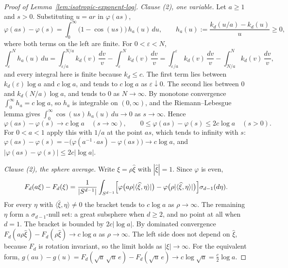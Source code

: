 \begin{proof}[Proof of Lemma~\ref{lem:isotropic-exponent-log}]
\emph{Clause (2), one variable.} Let $a \ge 1$ and $s > 0$. Substituting $u = ar$ in
$\varphi(as)$,
\[
  \varphi(as) - \varphi(s) = \int_0^\infty \bigl(1 - \cos(us)\bigr)\,h_a(u)\,du ,
  \qquad h_a(u) := \frac{k_d(u/a) - k_d(u)}{u} \ge 0 ,
\]
where both terms on the left are finite. For $0 < \varepsilon < N$,
\[
  \int_\varepsilon^N h_a(u)\,du = \int_{\varepsilon/a}^{N/a}k_d(v)\,\frac{dv}{v}
     - \int_\varepsilon^N k_d(v)\,\frac{dv}{v}
   = \int_{\varepsilon/a}^{\varepsilon}k_d(v)\,\frac{dv}{v} - \int_{N/a}^{N}k_d(v)\,\frac{dv}{v} ,
\]
and every integral here is finite because $k_d \le c$. The first term lies between
$k_d(\varepsilon)\log a$ and $c\log a$, and tends to $c\log a$ as $\varepsilon \downarrow 0$. The
second lies between $0$ and $k_d(N/a)\log a$, and tends to $0$ as $N \to \infty$. By monotone
convergence $\int_0^\infty h_a = c\log a$, so $h_a$ is integrable on $(0,\infty)$, and the
Riemann--Lebesgue lemma gives $\int_0^\infty\cos(us)\,h_a(u)\,du \to 0$ as $s \to \infty$. Hence
\[
  \varphi(as) - \varphi(s) \to c\log a \quad (s \to \infty),
  \qquad 0 \le \varphi(as) - \varphi(s) \le 2c\log a \quad (s > 0).
\]
For $0 < a < 1$ apply this with $1/a$ at the point $as$, which tends to infinity with $s$:
$\varphi(as) - \varphi(s) = -\bigl(\varphi(a^{-1}\cdot as) - \varphi(as)\bigr) \to c\log a$, and
$|\varphi(as) - \varphi(s)| \le 2c|\log a|$.

\emph{Clause (2), the sphere average.} Write $\xi = \rho\widehat\xi$ with $|\widehat\xi| = 1$.
Since $\varphi$ is even,
\[
  F_d(a\xi) - F_d(\xi) = \frac{1}{|S^{d-1}|}\int_{S^{d-1}}
    \Bigl[\varphi\bigl(a\rho|\langle\widehat\xi,\eta\rangle|\bigr)
      - \varphi\bigl(\rho|\langle\widehat\xi,\eta\rangle|\bigr)\Bigr]
    \sigma_{d-1}(d\eta) .
\]
For every $\eta$ with $\langle\widehat\xi,\eta\rangle \ne 0$ the bracket tends to $c\log a$ as
$\rho \to \infty$. The remaining $\eta$ form a $\sigma_{d-1}$-null set: a great subsphere when
$d \ge 2$, and no point at all when $d = 1$. The bracket is bounded by $2c|\log a|$. By dominated
convergence $F_d(a\rho\widehat\xi) - F_d(\rho\widehat\xi) \to c\log a$ as $\rho \to \infty$. The
left side does not depend on $\widehat\xi$, because $F_d$ is rotation invariant, so the limit holds
as $|\xi| \to \infty$. For the equivalent form, $g(au) - g(u) = F_d(\sqrt a\,\sqrt u\,e) -
F_d(\sqrt u\,e) \to c\log\sqrt a = \tfrac c2\log a$.
\end{proof}

